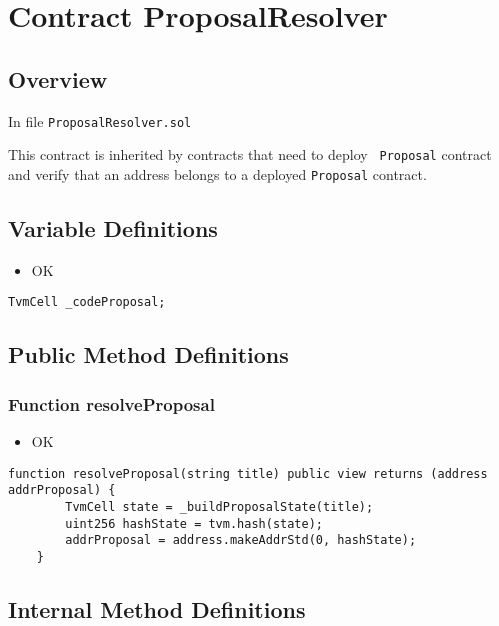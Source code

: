 
\chapter{Contract ProposalResolver}

\minitoc

\section{Overview}

In file {\tt ProposalResolver.sol}

This contract is inherited by contracts that need to deploy {\tt
  Proposal} contract and verify that an address belongs to a deployed
{\tt Proposal} contract.

\section{Variable Definitions}

\begin{itemize}
\item OK
\end{itemize}

\begin{lstlisting}[firstnumber=6]
    TvmCell _codeProposal;
\end{lstlisting}

\section{Public Method Definitions}


\subsection{Function resolveProposal}

\begin{itemize}
\item OK
\end{itemize}

\begin{lstlisting}[firstnumber=8]
    function resolveProposal(string title) public view returns (address addrProposal) {
        TvmCell state = _buildProposalState(title);
        uint256 hashState = tvm.hash(state);
        addrProposal = address.makeAddrStd(0, hashState);
    }
\end{lstlisting}

\section{Internal Method Definitions}


